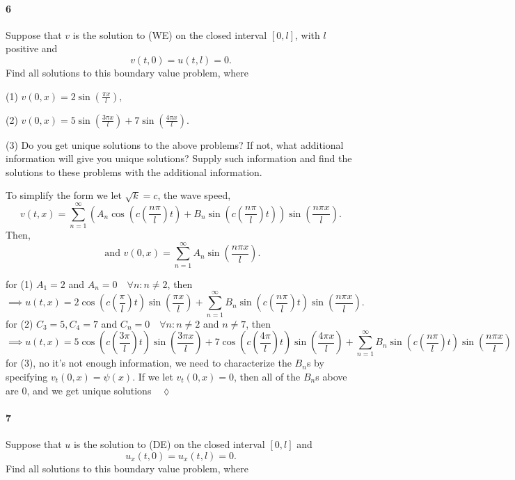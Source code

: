\documentclass{article}
\begin{document}
\paragraph{6} Suppose that $v$ is the solution to (WE) on the closed
interval $[0, l]$, with $l$ positive
and
\[v(t, 0) = u(t, l) = 0.\]
Find all solutions to this boundary value problem, where

(1) $v(0, x) = 2 \sin\left( \frac{\pi x}{l} \right),$

(2) $v(0, x) = 5 \sin\left( \frac{3\pi x}{l} \right) +7 \sin\left( \frac{4\pi x}{l} \right).$


(3) Do you get unique solutions to the above problems? If not, what additional information
will give you unique solutions? Supply such information and find the solutions to these
problems with the additional information.


To simplify the form we let $\sqrt{k} = c$, the wave speed,
\[v(t,x) = \sum_{n=1}^\infty\left(
    A_n\cos\left(c\left(  \frac{ n\pi
        }{l}\right)t\right) + B_n\sin\left(c\left(  \frac{n\pi}{l}\right) t\right) \right)\sin\left( \frac{n\pi x}{l}
  \right).\]
Then, \[\text{ and }v(0,x) = \sum_{n=1}^\infty A_n\sin\left( \frac{n\pi x}{l}
  \right).\]

for (1) $A_1 = 2 $ and $ A_n = 0\quad  \forall n: n\neq 2$, then
\[\implies u(t,x) = 2\cos\left(c\left(
      \frac{\pi}{l}\right)t \right)\sin\left( \frac{\pi x}{l}
  \right) + \sum_{n=1}^\infty B_n\sin\left(c\left(  \frac{n\pi}{l}\right) t\right)\sin\left( \frac{n\pi x}{l}
  \right).\]
for (2) $C_3 = 5,C_4 = 7 $ and $ C_n = 0\quad  \forall n: n\neq 2$ and
$n \neq 7$, then
\[\implies u(t,x) = 5\cos\left(c\left(
      \frac{3\pi}{l}\right)t \right)\sin\left( \frac{3\pi x}{l}
  \right)+7\cos\left(c\left(
      \frac{4\pi}{l}\right)t \right)\sin\left( \frac{4\pi x}{l}
  \right)+ \sum_{n=1}^\infty B_n\sin\left(c\left(  \frac{n\pi}{l}\right) t\right)\sin\left( \frac{n\pi x}{l}\right)\]
for (3), no it's not enough information, we need to characterize the
$B_n$s by specifying $v_t(0,x) = \psi(x)$. If we let $v_t(0,x) = 0$,
then all of the $B_n$s above are $0$, and we get unique
solutions$\quad \lozenge$

\paragraph{7} Suppose that $u$ is the solution to (DE) on the closed interval $[0, l]$ and
\[u_x(t, 0) = u_x(t, l) = 0.\]
Find all solutions to this boundary value problem, where
\end{document}
